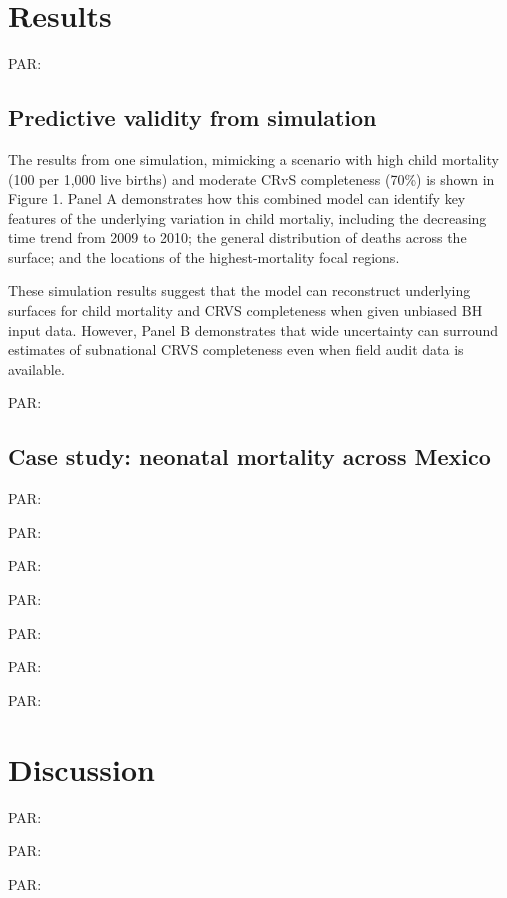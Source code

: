 \documentclass[
]{article}
\begin{document}
\hypertarget{results}{%
\section{Results}\label{results}}

PAR:

\hypertarget{predictive-validity-from-simulation}{%
\subsection{Predictive validity from simulation}\label{predictive-validity-from-simulation}}

The results from one simulation, mimicking a scenario with high child mortality (100 per 1,000 live births) and moderate CRvS completeness (70\%) is shown in Figure 1. Panel A demonstrates how this combined model can identify key features of the underlying variation in child mortaliy, including the decreasing time trend from 2009 to 2010; the general distribution of deaths across the surface; and the locations of the highest-mortality focal regions.

These simulation results suggest that the model can reconstruct underlying surfaces for child mortality and CRVS completeness when given unbiased BH input data. However, Panel B demonstrates that wide uncertainty can surround estimates of subnational CRVS completeness even when field audit data is available.

PAR:

\hypertarget{case-study-neonatal-mortality-across-mexico}{%
\subsection{Case study: neonatal mortality across Mexico}\label{case-study-neonatal-mortality-across-mexico}}

PAR:

PAR:

PAR:

PAR:

PAR:

PAR:

PAR:

\hypertarget{discussion}{%
\section{Discussion}\label{discussion}}

PAR:

PAR:

PAR:
\end{document}
